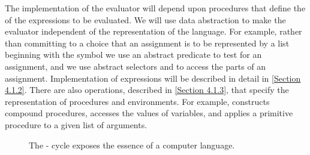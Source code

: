 The implementation of the evaluator will depend upon procedures that define the  of the expressions to be evaluated.
We will use data abstraction to make the evaluator independent of the representation of the language.
For example, rather than committing to a choice that an assignment is to be represented by a list beginning with the symbol  we use an abstract predicate  to test for an assignment, and we use abstract selectors  and  to access the parts of an assignment.
Implementation of expressions will be described in detail in \cref{Section 4.1.2}.
There are also operations, described in \cref{Section 4.1.3}, that specify the representation of procedures and environments.
For example,  constructs compound procedures,  accesses the values of variables, and  applies a primitive procedure to a given list of arguments.

\begin{figure}[tb]
	\centering
	
	\caption{
		The - cycle exposes the essence of a computer language.
	}
	\label{Figure 4.1}
\end{figure}









